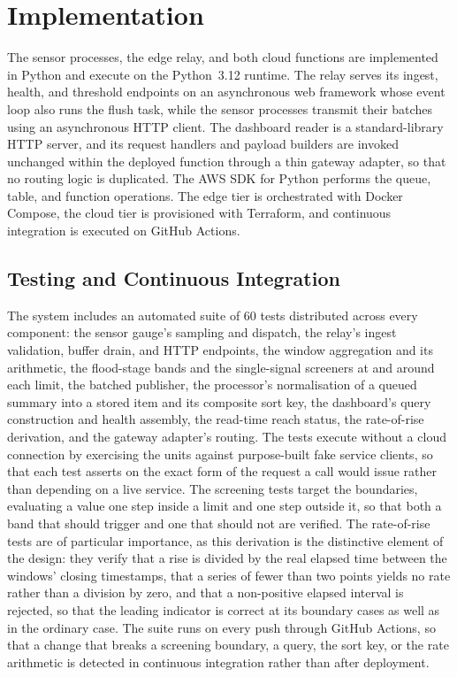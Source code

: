 \documentclass[conference]{IEEEtran}
\begin{document}
\section{Implementation}

The sensor processes, the edge relay, and both cloud functions are implemented in Python and execute on the Python~3.12 runtime. The relay serves its ingest, health, and threshold endpoints on an asynchronous web framework whose event loop also runs the flush task, while the sensor processes transmit their batches using an asynchronous HTTP client. The dashboard reader is a standard-library HTTP server, and its request handlers and payload builders are invoked unchanged within the deployed function through a thin gateway adapter, so that no routing logic is duplicated. The AWS SDK for Python performs the queue, table, and function operations. The edge tier is orchestrated with Docker Compose, the cloud tier is provisioned with Terraform, and continuous integration is executed on GitHub Actions.

\subsection{Testing and Continuous Integration}

The system includes an automated suite of 60 tests distributed across every component: the sensor gauge's sampling and dispatch, the relay's ingest validation, buffer drain, and HTTP endpoints, the window aggregation and its arithmetic, the flood-stage bands and the single-signal screeners at and around each limit, the batched publisher, the processor's normalisation of a queued summary into a stored item and its composite sort key, the dashboard's query construction and health assembly, the read-time reach status, the rate-of-rise derivation, and the gateway adapter's routing. The tests execute without a cloud connection by exercising the units against purpose-built fake service clients, so that each test asserts on the exact form of the request a call would issue rather than depending on a live service. The screening tests target the boundaries, evaluating a value one step inside a limit and one step outside it, so that both a band that should trigger and one that should not are verified. The rate-of-rise tests are of particular importance, as this derivation is the distinctive element of the design: they verify that a rise is divided by the real elapsed time between the windows' closing timestamps, that a series of fewer than two points yields no rate rather than a division by zero, and that a non-positive elapsed interval is rejected, so that the leading indicator is correct at its boundary cases as well as in the ordinary case. The suite runs on every push through GitHub Actions, so that a change that breaks a screening boundary, a query, the sort key, or the rate arithmetic is detected in continuous integration rather than after deployment.
\end{document}

